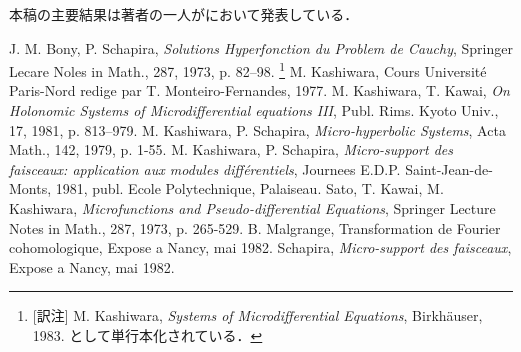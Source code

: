 本稿の主要結果は著者の一人が\cite{Sch82}において発表している．
\begin{thebibliography}{20}
     J. M. Bony, P. Schapira, 
        \emph{Solutions Hyperfonction du Problem de Cauchy}, 
        Springer Lecare Noles in Math., 287, 1973, p. 82--98.
    \footnote{[訳注] M. Kashiwara, \emph{Systems of Microdifferential Equations}, Birkh\"auser, 1983. として単行本化されている．} M. Kashiwara, 
        Cours Universit\'e Paris-Nord redige 
        par T. Monteiro-Fernandes, 1977.
     M. Kashiwara, T. Kawai, 
        \emph{On Holonomic Systems of Microdifferential equations III}, 
        Publ. Rims. Kyoto Univ., 17, 1981, p. 813--979.
     M. Kashiwara, P. Schapira, \emph{Micro-hyperbolic Systems}, 
        Acta Math., 142, 1979, p. 1-55.
     M. Kashiwara, P. Schapira, 
        \emph{Micro-support des faisceaux: application aux modules diff\'erentiels}, 
        Journees E.D.P. Saint-Jean-de-Monts, 1981, publ. Ecole Polytechnique, Palaiseau.
     Sato, T. Kawai, M. Kashiwara, 
        \emph{Microfunctions and Pseudo-differential Equations}, 
        Springer Lecture Notes in Math., 287, 1973, p. 265-529.
     B. Malgrange, Transformation de Fourier cohomologique, Expose a Nancy, mai 1982.
     Schapira, \emph{Micro-support des faisceaux}, 
        Expose a Nancy, mai 1982.
\end{thebibliography}

